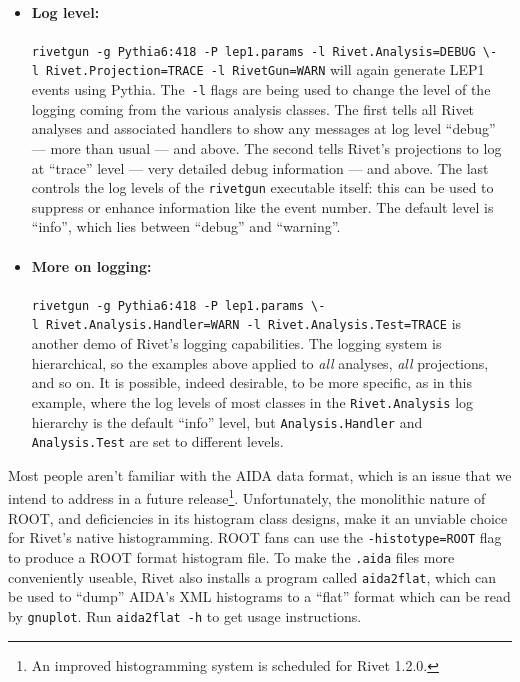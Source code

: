 \documentclass{JHEP3}
\newcommand{\kbd}[1]{\texttt{#1}\xspace}
\newcommand{\cmdbreak}{\textbackslash\newline}
\begin{document}
\begin{itemize}
\item \paragraph{Log level:}{\kbd{rivetgun -g~Pythia6:418 -P~lep1.params
      -l~Rivet.Analysis=DEBUG~\cmdbreak -l~Rivet.Projection=TRACE -l~RivetGun=WARN}
    will again generate LEP1 events using Pythia. The~\kbd{-l} flags are being
    used to change the level of the logging coming from the various analysis
    classes. The first tells all Rivet analyses and associated handlers to show
    any messages at log level ``debug'' --- more than usual --- and above. The
    second tells Rivet's projections to log at ``trace'' level --- very detailed
    debug information --- and above. The last controls the log levels of the
    \kbd{rivetgun} executable itself: this can be used to suppress or enhance
    information like the event number. The default level is ``info'', which lies
    between ``debug'' and ``warning''.}

\item \paragraph{More on logging:}{\kbd{rivetgun -g~Pythia6:418 -P~lep1.params
      \cmdbreak -l~Rivet.Analysis.Handler=WARN -l~Rivet.Analysis.Test=TRACE}
    is another demo of Rivet's logging capabilities. The logging system is
    hierarchical, so the examples above applied to \emph{all} analyses,
    \emph{all} projections, and so on. It is possible, indeed desirable, to be
    more specific, as in this example, where the log levels of most classes in
    the \kbd{Rivet.Analysis} log hierarchy is the default ``info'' level, but
    \kbd{Analysis.Handler} and \kbd{Analysis.Test} are set to different levels.}
\end{itemize}

Most people aren't familiar with the AIDA data format, which is an issue that we
intend to address in a future release\footnote{An improved histogramming system
  is scheduled for Rivet 1.2.0.}. Unfortunately, the monolithic nature of ROOT,
and deficiencies in its histogram class designs, make it an unviable choice for
Rivet's native histogramming. ROOT fans can use the \kbd{-\-histotype=ROOT} flag
to produce a ROOT format histogram file. To make the \kbd{.aida} files more
conveniently useable, Rivet also installs a program called \kbd{aida2flat},
which can be used to ``dump'' AIDA's XML histograms to a ``flat'' format which
can be read by \kbd{gnuplot}. Run \kbd{aida2flat -h} to get usage instructions.
\end{document}
